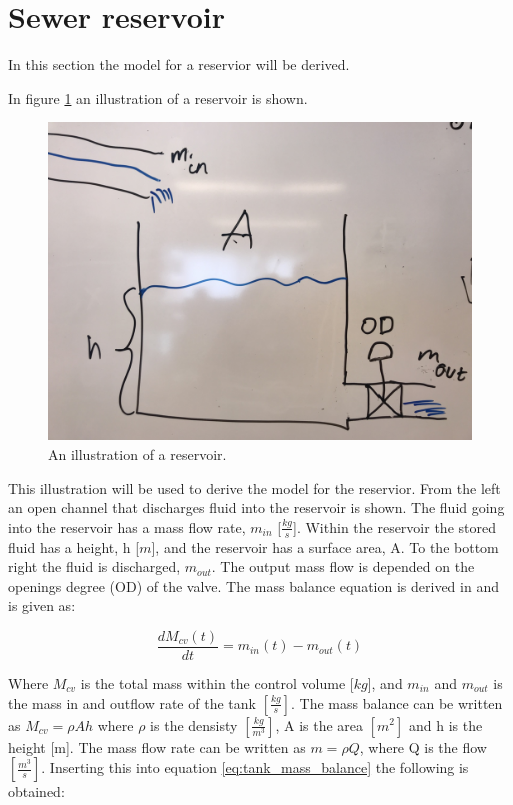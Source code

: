 \section{Sewer reservoir}\label{se:sewer_reservoir}
In this section the model for a reservior will be derived. 

In figure \ref{fig:tank_model} an illustration of a reservoir is shown.
\begin{figure}[H]
\centering
\includegraphics[width=.6\textwidth]{report/modeling/pictures/tank_model.jpg}
\caption{An illustration of a reservoir.}
\label{fig:tank_model}
\end{figure} 

This illustration will be used to derive the model for the reservior. From the left an open channel that discharges fluid into the reservoir is shown. The fluid going into the reservoir has a mass flow rate, $m_{in}$ [$\frac{kg}{s}$]. Within the reservoir the stored fluid has a height, h [$m$], and the reservoir has a surface area, A. To the bottom right the fluid is discharged, $m_{out}$. The output mass flow is depended on the openings degree (OD) of the valve. The mass balance equation is derived in \cite{model_tank} and is given as:


\begin{equation}
	 	\frac{dM_{cv}(t)}{dt}=m_{in}(t)-m_{o ut}(t)
\label{eq:tank_mass_balance}
\end{equation} 

Where $M_{cv}$ is the total mass within the control volume [$kg$], and $m_{in}$ and $m_{out}$ is the mass in and outflow rate of the tank $\left[\frac{kg}{s}\right]$. The mass balance can be written as $M_{cv} = \rho Ah$ where $\rho$ is the densisty $\left[\frac{kg}{m^3}\right]$, A is the area $\left[m^2\right]$ and h is the height [m]. The mass flow rate can be written as $m = \rho Q$, where Q is the flow $\left[\frac{m^3}{s}\right]$. Inserting this into equation \ref{eq:tank_mass_balance} the following is obtained:

